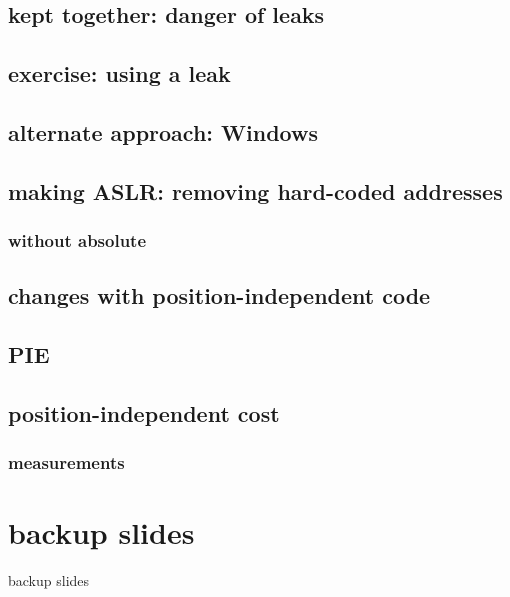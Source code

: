 \subsection{kept together: danger of leaks}



\subsection{exercise: using a leak}



\subsection{alternate approach: Windows}


\subsection{making ASLR: removing hard-coded addresses}


\subsubsection{without absolute}


\subsection{changes with position-independent code}


\subsection{PIE}


\subsection{position-independent cost}


\subsubsection{measurements}


\section{backup slides}
\begin{frame}{backup slides}
\end{frame}





